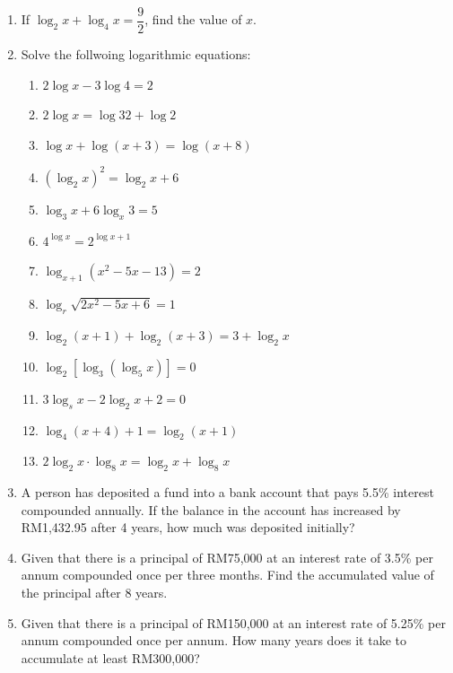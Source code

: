 \documentclass[12pt]{report}
\begin{document}
\begin{multicols}{2}
\begin{enumerate}
        \item If $\log_2 x + \log_4 x = \dfrac{9}{2}$, find the value of $x$.
        \item Solve the follwoing logarithmic equations:
              \begin{enumerate}
                  \item $2\log x-3\log4=2$
                  \item $2\log x=\log32+\log2$
                  \item $\log x+\log\left(x+3\right)=\log\left(x+8\right)$
                  \item $\left(\log_{2}x\right)^{2}=\log_{2}x+6$
                  \item $\log_{3}x+6\log_{x}3=5$
                  \item $4^{\log x}=2^{\log x+1}$
                  \item $\log_{x+1}\left(x^{2}-5x-13\right)=2$
                  \item $\log_{r}{\sqrt{2x^{2}-5x+6}}=1$
                  \item $\log_{2}(x+1)+\log_{2}(x+3)=3+\log_{2}x$
                  \item $\log_{2}\left[\log_{3}\left(\log_{5}x\right)\right]=0$
                  \item $3\log_{s}x-2\log_{2}x+2=0$
                  \item $\log_{4}(x+4)+1=\log_{2}(x+1)$
                  \item $2\log_{2}x\cdot\log_{8}x=\log_{2}x+\log_{8}x$
              \end{enumerate}

        \item A person has deposited a fund into a bank account that pays 5.5\% interest
              compounded annually. If the balance in the account has increased by RM1,432.95
              after 4 years, how much was deposited initially?

        \item Given that there is a principal of RM75,000 at an interest rate of 3.5\% per
              annum compounded once per three months. Find the accumulated value of the
              principal after 8 years.

        \item Given that there is a principal of RM150,000 at an interest rate of 5.25\% per
              annum compounded once per annum. How many years does it take to accumulate at
              least RM300,000?


\end{enumerate}
\end{multicols}
\end{document}
